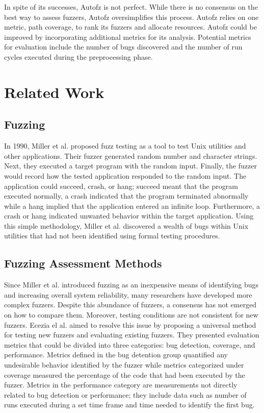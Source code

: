 In spite of its successes, Autofz is not perfect. While there is no consensus on the best way to assess fuzzers, Autofz oversimplifies this process. Autofz relies on one metric, path coverage, to rank its fuzzers and allocate resources. Autofz could be improved by incorporating additional metrics for its analysis. Potential metrics for evaluation include the number of bugs discovered and the number of run cycles executed during the preprocessing phase.

\section{Related Work}

\subsection{Fuzzing}
In 1990, Miller et al. proposed fuzz testing as a tool to test Unix utilities and other applications. Their fuzzer generated random number and character strings. Next, they executed a target program with the random input. Finally, the fuzzer would record how the tested application responded to the random input. The application could succeed, crash, or hang; succeed meant that the program executed normally, a crash indicated that the program terminated abnormally while a hang implied that the application entered an infinite loop. Furthermore, a crash or hang indicated unwanted behavior within the target application. Using this simple methodology, Miller et al. discovered a wealth of bugs within Unix utilities that had not been identified using formal testing procedures. \cite{Miller}

\subsection{Fuzzing Assessment Methods}
Since Miller et al. introduced fuzzing as an inexpensive means of identifying bugs and increasing overall system reliability, many researchers have developed more complex fuzzers. Despite this abundance of fuzzers, a consensus has not emerged on how to compare them. Moreover, testing conditions are not consistent for new fuzzers. Ecezia el al. aimed to resolve this issue by proposing a universal method for testing new fuzzers and evaluating existing fuzzers. They presented evaluation metrics that could be divided into three categories: bug detection, coverage, and performance. Metrics defined in the bug detention group quantified any undesirable behavior identified by the fuzzer while metrics categorized under coverage measured the percentage of the code that had been executed by the fuzzer. Metrics in the performance category are measurements not directly related to bug detection or performance; they include data such as number of runs executed during a set time frame and time needed to identify the first bug.

